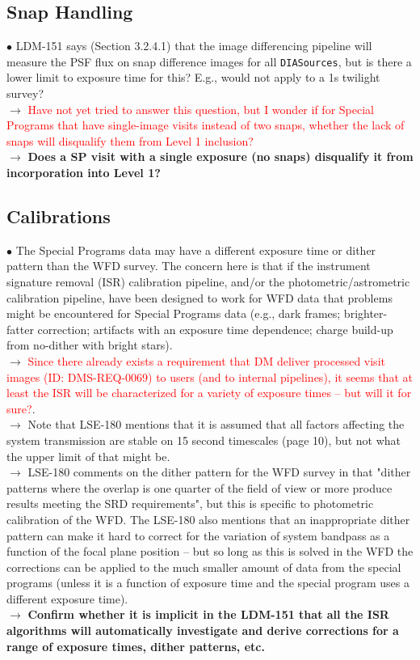 \documentclass[DM,lsstdraft,toc]{lsstdoc}
\begin{document}
\subsection{Snap Handling}\label{ssec:issues_snaps}

$\bullet$ LDM-151 says (Section 3.2.4.1) that the image differencing pipeline will measure the PSF flux on snap difference images for all {\tt DIASources}, but is there a lower limit to exposure time for this? E.g., would not apply to a 1s twilight survey? \\
$\rightarrow$ \textcolor{red}{Have not yet tried to answer this question, but I wonder if for Special Programs that have single-image visits instead of two snaps, whether the lack of snaps will disqualify them from Level 1 inclusion?}\\
$\rightarrow$ \textbf{Does a SP visit with a single exposure (no snaps) disqualify it from incorporation into Level 1?}


\subsection{Calibrations}\label{ssec:issues_calibrations}

$\bullet$ The Special Programs data may have a different exposure time or dither pattern than the WFD survey. The concern here is that if the instrument signature removal (ISR) calibration pipeline, and/or the photometric/astrometric calibration pipeline, have been designed to work for WFD data that problems might be encountered for Special Programs data (e.g., dark frames; brighter-fatter correction; artifacts with an exposure time dependence; charge build-up from no-dither with bright stars). \\
$\rightarrow$ \textcolor{red}{Since there already exists a requirement that DM deliver processed visit images (ID: DMS-REQ-0069) to users (and to internal pipelines), it seems that at least the ISR will be characterized for a variety of exposure times -- but will it for sure?}. \\
$\rightarrow$ Note that LSE-180 mentions that it is assumed that all factors affecting the system transmission are stable on 15 second timescales (page 10), but not what the upper limit of that might be. \\
$\rightarrow$ LSE-180 comments on the dither pattern for the WFD survey in that "dither patterns where the overlap is one quarter of the field of view or more produce results meeting the SRD requirements", but this is specific to photometric calibration of the WFD. The LSE-180 also mentions that an inappropriate dither pattern can make it hard to correct for the variation of system bandpass as a function of the focal plane position -- but so long as this is solved in the WFD the corrections can be applied to the much smaller amount of data from the special programs (unless it is a function of exposure time and the special program uses a different exposure time). \\
$\rightarrow$ \textbf{Confirm whether it is implicit in the LDM-151 that all the ISR algorithms will automatically investigate and derive corrections for a range of exposure times, dither patterns, etc.}
\end{document}
